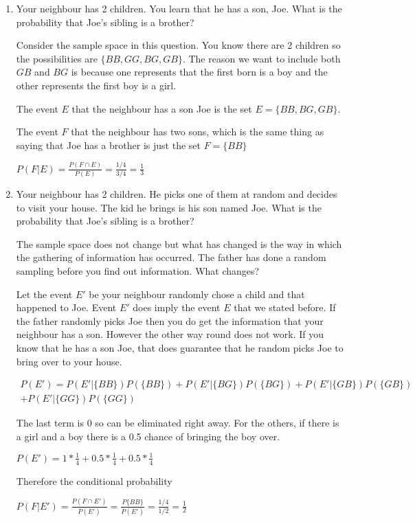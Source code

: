 \documentclass[12pt]{article}
\begin{document}
\begin{enumerate}
\item Your neighbour has 2 children. You learn that he has a son, Joe. What is the probability that Joe's sibling is a
brother?

Consider the sample space in this question. You know there are 2 children so the possibilities are $\{BB,GG,BG,GB\}$. The reason we want to include both $GB$ and $BG$ is because one represents that the first born is a boy and the other represents the first boy is a girl.

The event $E$ that the neighbour has a son Joe is the set $E = \{BB,BG,GB\}$.

The event $F$ that the neighbour has two sons, which is the same thing as saying that Joe has a brother is just the set $F = \{BB\}$

$P(F|E) = \frac{P(F \cap E)}{P(E)} = \frac{1/4}{3/4} = \frac{1}{3}$


\item Your neighbour has 2 children. He picks one of them at random and decides to visit your house. The kid he brings is his son named Joe. What is the probability that Joe's sibling is a brother?

The sample space does not change but what has changed is the way in which the gathering of information has occurred. The father has done a random sampling before you find out information.
What changes? 

Let the event $E'$ be your neighbour randomly chose a child and that happened to Joe. Event $E'$ does imply the event $E$ that we stated before. If the father randomly picks Joe then you do get the information that your neighbour has a son. However the other way round does not work. If you know that he has a son Joe, that does guarantee that he random picks Joe to bring over to your house.

\begin{multline*}
P(E') = P(E'|\{BB\}) P(\{BB\}) + P(E'|\{BG\}) P(\{BG\}) + P(E'|\{GB\})  P(\{GB\}) \\
+ P(E'|\{GG\})P (\{GG\})
\end{multline*}

The last term is 0 so can be eliminated right away. For the others, if there is a girl and a boy there is a 0.5 chance of bringing the boy over.

$P(E') = 1 * \frac{1}{4} + 0.5 * \frac{1}{4} + 0.5 * \frac{1}{4}$

Therefore the conditional probability

$P(F|E') = \frac{P(F \cap E')}{P(E')} = \frac{P\{BB\}}{P(E')} = \frac{1/4}{1/2} = \frac{1}{2}$


\end{enumerate}
\end{document}
